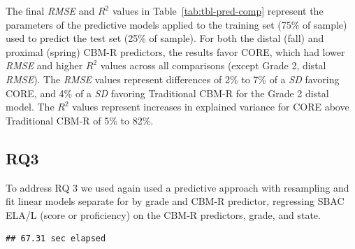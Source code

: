 \documentclass[
  english,
  man, fleqn, noextraspace]{apa6}
\begin{document}
The final \emph{RMSE} and \(R^2\) values in Table~\ref{tab:tbl-pred-comp} represent the parameters of the predictive models applied to the training set (75\% of sample) used to predict the test set (25\% of sample). For both the distal (fall) and proximal (spring) CBM-R predictors, the results favor CORE, which had lower \emph{RMSE} and higher \(R^2\) values across all comparisons (except Grade 2, distal \emph{RMSE}). The \emph{RMSE} values represent differences of 2\% to 7\% of a \emph{SD} favoring CORE, and 4\% of a \emph{SD} favoring Traditional CBM-R for the Grade 2 distal model. The \(R^2\) values represent increases in explained variance for CORE above Traditional CBM-R of 5\% to 82\%.

\hypertarget{rq3}{%
\subsection{RQ3}\label{rq3}}

To address RQ 3 we used again used a predictive approach with resampling and fit linear models separate for by grade and CBM-R predictor, regressing SBAC ELA/L (score or proficiency) on the CBM-R predictors, grade, and state.

\begin{verbatim}
## 67.31 sec elapsed
\end{verbatim}
\end{document}
